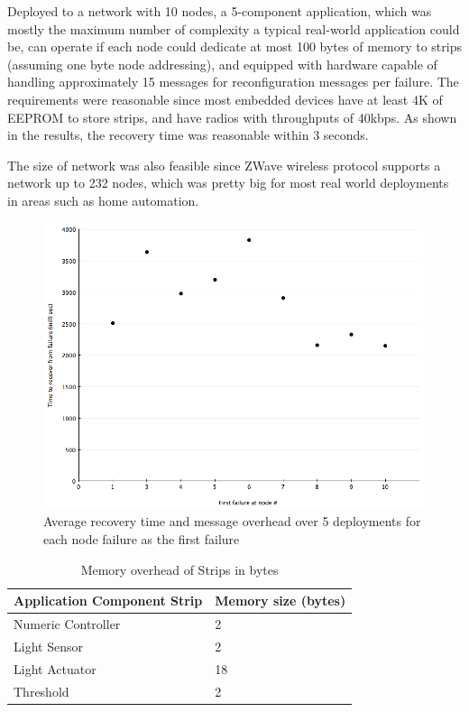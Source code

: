 Deployed to a network with 10 nodes, a 5-component application, which was mostly
the maximum number of complexity a typical real-world application could be, can
operate if each node could dedicate at most 100 bytes of memory to strips
(assuming one byte node addressing), and equipped with hardware
capable of handling approximately 15 messages for reconfiguration messages per
failure. The requirements were reasonable since most embedded devices have at
least 4K of EEPROM to store strips, and have radios with throughputs of 40kbps.
As shown in the results, the recovery time was reasonable within 3 seconds.

The size of network was also feasible since ZWave wireless protocol supports
a network up to 232 nodes, which was pretty big for most real world deployments
in areas such as home automation. 

\begin{figure}[h!]
\centering
    \includegraphics[width=\linewidth]{figures/results-average-recovery-time-plus-message-overhead}
\caption{Average recovery time and message overhead over 5 deployments for each
node failure as the first failure}
\label{fig:results}
\end{figure}

\begin{table}
\centering
\caption{Memory overhead of Strips in bytes}
\label{tbl:results-memory-overhead-strip}
  \begin{tabular}{|l|l|}
  \hline
  \textbf{Application Component Strip} & \textbf{Memory size (bytes)} \\
  \hline
  Numeric Controller & 2 \\
  \hline
  Light Sensor & 2 \\
  \hline
  Light Actuator & 18 \\
  \hline
  Threshold & 2 \\
  \hline
  \end{tabular}
\end{table}


